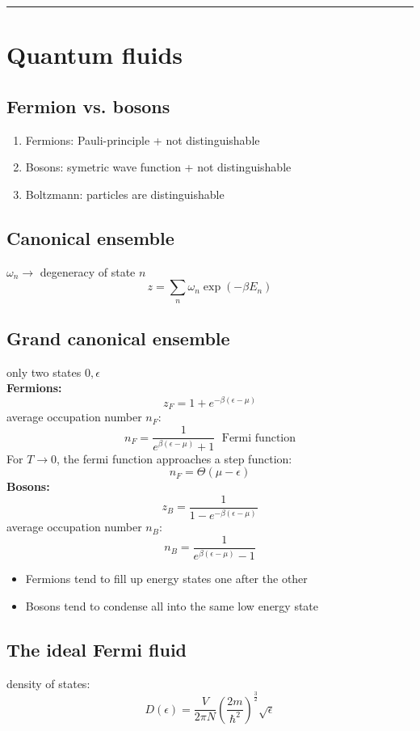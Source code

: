 \noindent\rule[1ex]{\textwidth/5}{1pt}
\section{Quantum fluids}

\subsection*{Fermion vs. bosons}
\begin{enumerate}
    \itemsep 0pt
    \item Fermions: Pauli-principle + not distinguishable
    \item Bosons: symetric wave function + not distinguishable
    \item Boltzmann: particles are distinguishable
\end{enumerate}

\subsection*{Canonical ensemble}
\(\omega_n \rightarrow \) degeneracy of state \(n\)
\[
    z = \sum_n \omega_n \exp \left(-\beta E_n\right)
\]

\subsection*{Grand canonical ensemble}
only two states \(0, \epsilon\) \\
\textbf{Fermions:}
\[
    z_F = 1+e^{-\beta(\epsilon-\mu)}
\]
average occupation number $n_F$:
\[
    n_F = \frac{1}{e^{\beta(\epsilon - \mu)}+1} \; \text{ Fermi function}
\]
For $T \rightarrow 0$, the fermi function approaches a step function:
\[
    n_F = \Theta (\mu - \epsilon)
\]
\textbf{Bosons:}
\[
    z_B = \frac{1}{1-e^{-\beta(\epsilon-\mu)}}
\]
average occupation number $n_B$:
\[
    n_B = \frac{1}{e^{\beta(\epsilon - \mu)}-1}
\]

\begin{itemize}
    \item Fermions tend to fill up energy states one after the other
    \item Bosons tend to condense all into the same low energy state
\end{itemize}

\subsection*{The ideal Fermi fluid}
density of states:
\[
    D(\epsilon) = \frac{V}{2\pi N} \left(\frac{2m}{\hbar^2}\right)^{\frac{3}{2}} \sqrt{\epsilon}
\]

